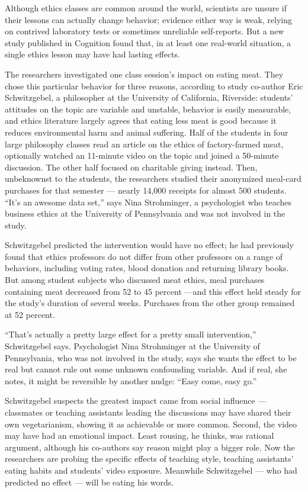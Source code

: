 Although ethics classes are common around the world, scientists are unsure if their lessons can actually change behavior; evidence either way is weak, relying on contrived laboratory tests or sometimes unreliable self-reports. But a new study published in Cognition found that, in at least one real-world situation, a single ethics lesson may have had lasting effects.


The researchers investigated one class session's impact on eating meat. They chose this particular behavior for three reasons, according to study co-author Eric Schwitzgebel, a philosopher at the University of California, Riverside: students' attitudes on the topic are variable and unstable, behavior is easily measurable, and ethics literature largely agrees that eating less meat is good because it reduces environmental harm and animal suffering. Half of the students in four large philosophy classes read an article on the ethics of factory-farmed meat, optionally watched an 11-minute video on the topic and joined a 50-minute discussion. The other half focused on charitable giving instead. Then, unbeknownst to the students, the researchers studied their anonymized meal-card purchases for that semester — nearly 14,000 receipts for almost 500 students. ``It's an awesome data set,'' says Nina Strohminger, a psychologist who teaches business ethics at the University of Pennsylvania and was not involved in the study.


Schwitzgebel predicted the intervention would have no effect; he had previously found that ethics professors do not differ from other professors on a range of behaviors, including voting rates, blood donation and returning library books. But among student subjects who discussed meat ethics, meal purchases containing meat decreased from 52 to 45 percent —and this effect held steady for the study's duration of several weeks. Purchases from the other group remained at 52 percent.


``That's actually a pretty large effect for a pretty small intervention,'' Schwitzgebel says. Psychologist Nina Strohminger at the University of Pennsylvania, who was not involved in the study, says she wants the effect to be real but cannot rule out some unknown confounding variable. And if real, she notes, it might be reversible by another nudge: ``Easy come, easy go.''


Schwitzgebel suspects the greatest impact came from social influence — classmates or teaching assistants leading the discussions may have shared their own vegetarianism, showing it as achievable or more common. Second, the video may have had an emotional impact. Least rousing, he thinks, was rational argument, although his co-authors say reason might play a bigger role. Now the researchers are probing the specific effects of teaching style, teaching assistants' eating habits and students' video exposure. Meanwhile Schwitzgebel — who had predicted no effect — will be eating his words. 